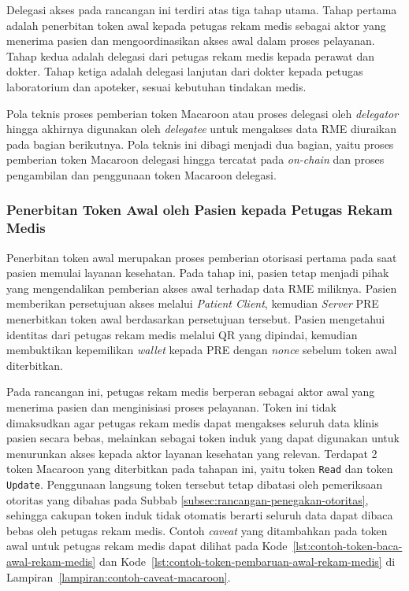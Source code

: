 Delegasi akses pada rancangan ini terdiri atas tiga tahap utama. Tahap pertama adalah penerbitan token awal kepada petugas rekam medis sebagai aktor yang menerima pasien dan mengoordinasikan akses awal dalam proses pelayanan. Tahap kedua adalah delegasi dari petugas rekam medis kepada perawat dan dokter. Tahap ketiga adalah delegasi lanjutan dari dokter kepada petugas laboratorium dan apoteker, sesuai kebutuhan tindakan medis.

Pola teknis proses pemberian token Macaroon atau proses delegasi oleh \textit{delegator} hingga akhirnya digunakan oleh \textit{delegatee} untuk mengakses data RME diuraikan pada bagian berikutnya. Pola teknis ini dibagi menjadi dua bagian, yaitu proses pemberian token Macaroon delegasi hingga tercatat pada \textit{on-chain} dan proses pengambilan dan penggunaan token Macaroon delegasi.

\subsubsection{Penerbitan Token Awal oleh Pasien kepada Petugas Rekam Medis}
\label{subsubsec:penerbitan-token-awal-oleh-pasien-kepada-petugas-rekam-medis}

Penerbitan token awal merupakan proses pemberian otorisasi pertama pada saat pasien memulai layanan kesehatan. Pada tahap ini, pasien tetap menjadi pihak yang mengendalikan pemberian akses awal terhadap data RME miliknya. Pasien memberikan persetujuan akses melalui \textit{Patient Client}, kemudian \textit{Server} PRE menerbitkan token awal berdasarkan persetujuan tersebut. Pasien mengetahui identitas dari petugas rekam medis melalui QR yang dipindai, kemudian membuktikan  kepemilikan \textit{wallet} kepada PRE dengan \textit{nonce} sebelum token awal diterbitkan.

Pada rancangan ini, petugas rekam medis berperan sebagai aktor awal yang menerima pasien dan menginisiasi proses pelayanan. Token ini tidak dimaksudkan agar petugas rekam medis dapat mengakses seluruh data klinis pasien secara bebas, melainkan sebagai token induk yang dapat digunakan untuk menurunkan akses kepada aktor layanan kesehatan yang relevan. Terdapat 2 token Macaroon yang diterbitkan pada tahapan ini, yaitu token \texttt{Read} dan token \texttt{Update}. Penggunaan langsung token tersebut tetap dibatasi oleh pemeriksaan otoritas yang dibahas pada Subbab \ref{subsec:rancangan-penegakan-otoritas}, sehingga cakupan token induk tidak otomatis berarti seluruh data dapat dibaca bebas oleh petugas rekam medis. Contoh \textit{caveat} yang ditambahkan pada token awal untuk petugas rekam medis dapat dilihat pada Kode~\ref{lst:contoh-token-baca-awal-rekam-medis} dan Kode~\ref{lst:contoh-token-pembaruan-awal-rekam-medis} di Lampiran~\ref{lampiran:contoh-caveat-macaroon}.

